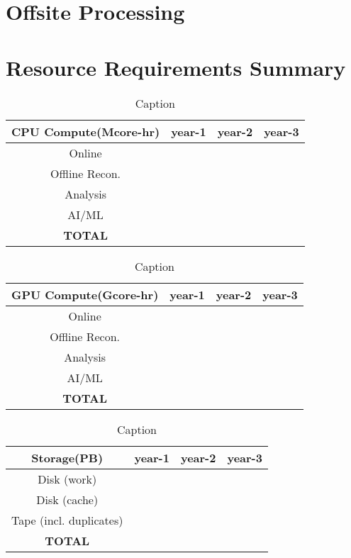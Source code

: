 \documentclass{article}
\begin{document}
\section{Offsite Processing}

\section{Resource Requirements Summary}



\begin{table}[htb!]
    \centering
    \begin{tabular}{c|c|c|c}
        \hline
        CPU Compute(Mcore-hr) & year-1 & year-2 & year-3 \\
        \hline
        \hline
        Online   & & & \\
        \hline
        Offline Recon. & & & \\
        \hline
        Analysis  & & & \\
        \hline
        AI/ML    & & & \\
        \hline
        \textbf{TOTAL} & & & \\
        \hline
    \end{tabular}
    \caption{Caption}
    \label{tab:cpu_summary}
\end{table}


\begin{table}[htb!]
    \centering
    \begin{tabular}{c|c|c|c}
        \hline
        GPU Compute(Gcore-hr) & year-1 & year-2 & year-3 \\
        \hline
        \hline
        Online   & & & \\
        \hline
        Offline Recon. & & & \\
        \hline
        Analysis  & & & \\
        \hline
        AI/ML    & & & \\
        \hline
        \textbf{TOTAL} & & & \\
        \hline
    \end{tabular}
    \caption{Caption}
    \label{tab:gpu_summary}
\end{table}



\begin{table}[htb!]
    \centering
    \begin{tabular}{c|c|c|c}
        \hline
        Storage(PB) & year-1 & year-2 & year-3 \\
        \hline
        \hline
        Disk (work)    & & & \\
        \hline
        Disk (cache)    & & & \\
        \hline
        Tape (incl. duplicates)    & & & \\
        \hline
        \textbf{TOTAL} & & & \\
        \hline
    \end{tabular}
    \caption{Caption}
    \label{tab:storage_summary}
\end{table}




\end{document}
